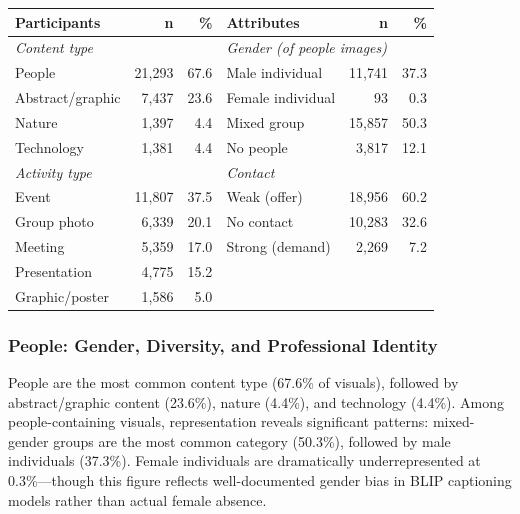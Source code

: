 \documentclass[../main.tex]{subfiles}
\begin{document}
\begin{center}
\small
\begin{tabular}{lrrlrr}
\toprule
\textbf{Participants} & \textbf{n} & \textbf{\%} & \textbf{Attributes} & \textbf{n} & \textbf{\%} \\
\midrule
\multicolumn{3}{l}{\textit{Content type}} & \multicolumn{3}{l}{\textit{Gender (of people images)}} \\
\quad People & 21,293 & 67.6 & \quad Male individual & 11,741 & 37.3 \\
\quad Abstract/graphic & 7,437 & 23.6 & \quad Female individual & 93 & 0.3 \\
\quad Nature & 1,397 & 4.4 & \quad Mixed group & 15,857 & 50.3 \\
\quad Technology & 1,381 & 4.4 & \quad No people & 3,817 & 12.1 \\
\midrule
\multicolumn{3}{l}{\textit{Activity type}} & \multicolumn{3}{l}{\textit{Contact}} \\
\quad Event & 11,807 & 37.5 & \quad Weak (offer) & 18,956 & 60.2 \\
\quad Group photo & 6,339 & 20.1 & \quad No contact & 10,283 & 32.6 \\
\quad Meeting & 5,359 & 17.0 & \quad Strong (demand) & 2,269 & 7.2 \\
\quad Presentation & 4,775 & 15.2 & & & \\
\quad Graphic/poster & 1,586 & 5.0 & & & \\
\bottomrule
\end{tabular}
\end{center}

\subsubsection{People: Gender, Diversity, and Professional Identity}

People are the most common content type (67.6\% of visuals), followed by abstract/graphic content (23.6\%), nature (4.4\%), and technology (4.4\%). Among people-containing visuals, representation reveals significant patterns: mixed-gender groups are the most common category (50.3\%), followed by male individuals (37.3\%). Female individuals are dramatically underrepresented at 0.3\%---though this figure reflects well-documented gender bias in BLIP captioning models rather than actual female absence.
\end{document}
